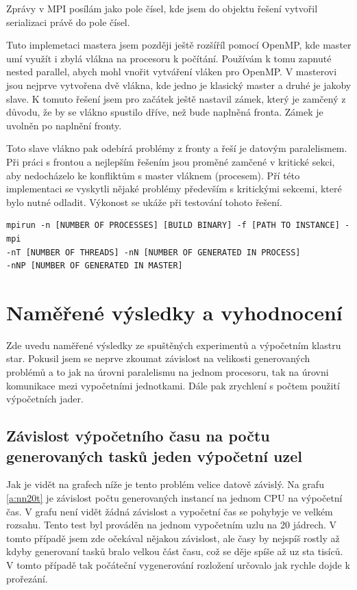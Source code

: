 \documentclass[]{article}
\begin{document}
Zprávy v MPI posílám jako pole čísel, kde jsem do objektu řešení vytvořil serializaci právě do pole čísel.

Tuto implemetaci mastera jsem později ještě rozšíříl pomocí OpenMP, kde master umí využít i zbylá vlákna na procesoru k počítání. Používám k tomu zapnuté nested parallel, abych mohl vnořit vytváření vláken pro OpenMP. V masterovi jsou nejprve vytvořena dvě vlákna, kde jedno je klasický master a druhé je jakoby slave. K tomuto řešení jsem pro začátek ještě nastavil zámek, který je zamčený z důvodu, že by se vlákno spustilo dříve, než bude naplněná fronta. Zámek je uvolněn po naplnění fronty. 

Toto slave vlákno pak odebírá problémy z fronty a řeší je datovým paralelismem. Při práci s frontou a nejlepším řešením jsou proměné zamčené v kritické sekci, aby nedocházelo ke konfliktům s master vláknem (procesem). Pří této implementaci se vyskytli nějaké problémy především s kritickými sekcemi, které bylo nutné odladit. Výkonost se ukáže při testování tohoto řešení.

\begin{verbatim}
mpirun -n [NUMBER OF PROCESSES] [BUILD BINARY] -f [PATH TO INSTANCE] -mpi 
-nT [NUMBER OF THREADS] -nN [NUMBER OF GENERATED IN PROCESS] 
-nNP [NUMBER OF GENERATED IN MASTER]
\end{verbatim}

\section{Naměřené výsledky a vyhodnocení}
Zde uvedu naměřené výsledky ze spuštěných experimentů a výpočetním klastru star. Pokusil jsem se neprve zkoumat závislost na velikosti generovaných problémů a to jak na úrovni paralelismu na jednom procesoru, tak na úrovni komunikace mezi vypočetními jednotkami. Dále pak zrychlení s počtem použití výpočetních jader.

\subsection{Závislost výpočetního času na počtu generovaných tasků jeden výpočetní uzel}

Jak je vidět na grafech níže je tento problém velice datově závislý. Na grafu \ref{a:nn20t} je závislost počtu generovaných instancí na jednom CPU na výpočetní čas. V grafu není vidět žádná závislost a vypočetní čas se pohybyje ve velkém rozsahu. Tento test byl prováděn na jednom vypočetním uzlu na 20 jádrech. V tomto případě jsem zde očekával nějakou závislost, ale časy by nejspíš rostly až kdyby generovaní tasků bralo velkou část času, což se děje spíše až uz sta tisíců. V tomto případě tak počáteční vygenerování rozložení určovalo jak rychle dojde k prořezání.
\end{document}
